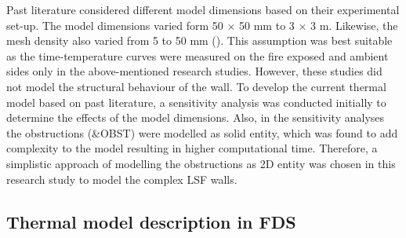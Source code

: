 Past literature considered different model dimensions based on their experimental set-up. The model dimensions varied form 50 $\times$ 50 mm to 3 $\times$ 3 m. Likewise, the mesh density also varied from 5 to 50 mm (\citet{Lazaro2018,Nguyen2018}). This assumption was best suitable as the time-temperature curves were measured on the fire exposed and ambient sides only in the above-mentioned research studies. However, these studies did not model the structural behaviour of the wall. To develop the current thermal model based on past literature, a sensitivity analysis was conducted initially to determine the effects of the model dimensions. Also, in the sensitivity analyses the obstructions (\&OBST) were modelled as solid entity, which was found to add complexity to the model resulting in higher computational time. Therefore, a simplistic approach of modelling the obstructions as 2D entity was chosen in this research study to model the complex LSF walls. 

\subsection{Thermal model description in FDS}

